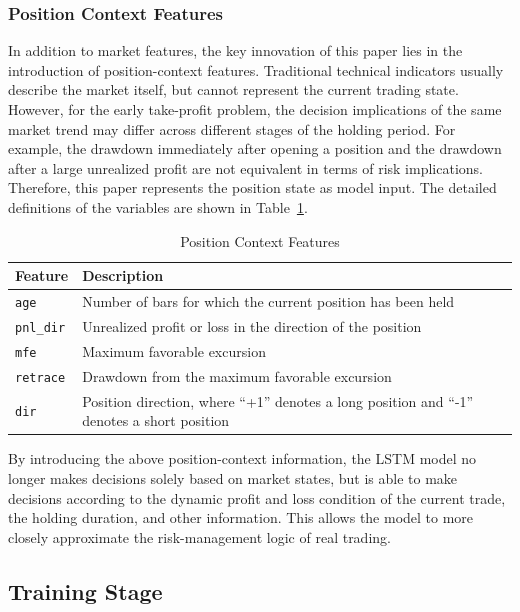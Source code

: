 \documentclass[12pt]{article}
\begin{document}
\subsubsection{Position Context Features}

In addition to market features, the key innovation of this paper lies in the introduction of position-context features. Traditional technical indicators usually describe the market itself, but cannot represent the current trading state. However, for the early take-profit problem, the decision implications of the same market trend may differ across different stages of the holding period. For example, the drawdown immediately after opening a position and the drawdown after a large unrealized profit are not equivalent in terms of risk implications. Therefore, this paper represents the position state as model input. The detailed definitions of the variables are shown in Table~\ref{tab:position_context_features}.

\begin{table}[H]
\centering
\caption{Position Context Features}
\label{tab:position_context_features}
\small
\renewcommand{\arraystretch}{1.2}
\begin{tabular}{p{}p{}}
\toprule
Feature & Description \\
\midrule
\texttt{age} & Number of bars for which the current position has been held \\
\texttt{pnl\_dir} & Unrealized profit or loss in the direction of the position \\
\texttt{mfe} & Maximum favorable excursion \\
\texttt{retrace} & Drawdown from the maximum favorable excursion \\
\texttt{dir} & Position direction, where ``+1'' denotes a long position and ``-1'' denotes a short position \\
\bottomrule
\end{tabular}
\end{table}

By introducing the above position-context information, the LSTM model no longer makes decisions solely based on market states, but is able to make decisions according to the dynamic profit and loss condition of the current trade, the holding duration, and other information. This allows the model to more closely approximate the risk-management logic of real trading.

\subsection{Training Stage}\label{subsec:training_stage}
\end{document}
